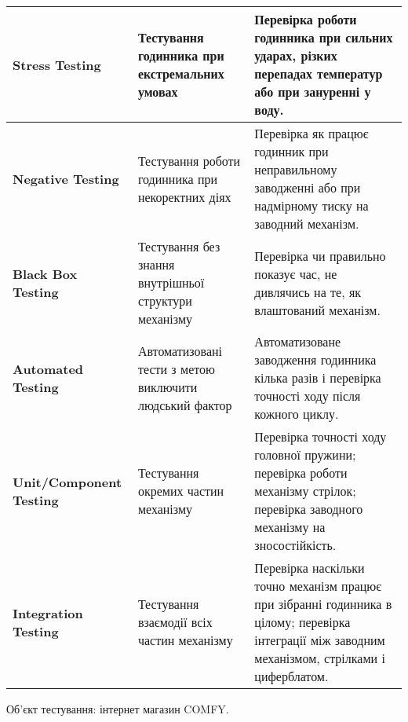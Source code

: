 \documentclass[oneside,14pt]{extarticle}
\begin{document}
\begin{normalsize}
\begin{longtable}{|p{4.5cm}|p{5cm}|p{7cm}|}
		\hline
		\textbf{Stress Testing} & Тестування годинника при екстремальних умовах & Перевірка роботи годинника при сильних ударах, різких перепадах температур або при зануренні у воду. \\
		\hline
		\textbf{Negative Testing} & Тестування роботи годинника при некоректних діях & Перевірка як працює годинник при неправильному заводженні або при надмірному тиску на заводний механізм. \\
		\hline
		\textbf{Black Box Testing} & Тестування без знання внутрішньої структури механізму & Перевірка чи правильно показує час, не дивлячись на те, як влаштований механізм. \\
		\hline
		\textbf{Automated Testing} & Автоматизовані тести з метою виключити людський фактор & Автоматизоване заводження годинника кілька разів і перевірка точності ходу після кожного циклу. \\
		\hline
		\textbf{Unit/Component Testing} & Тестування окремих частин механізму & Перевірка точності ходу головної пружини; перевірка роботи механізму стрілок; перевірка заводного механізму на зносостійкість. \\
		\hline
		\textbf{Integration Testing} & Тестування взаємодії всіх частин механізму & Перевірка наскільки точно механізм працює при зібранні годинника в цілому; перевірка інтеграції між заводним механізмом, стрілками і циферблатом. \\
		\hline
	\end{longtable}
	
	Об'єкт тестування: інтернет магазин COMFY.
	

\end{normalsize}
\end{document}
